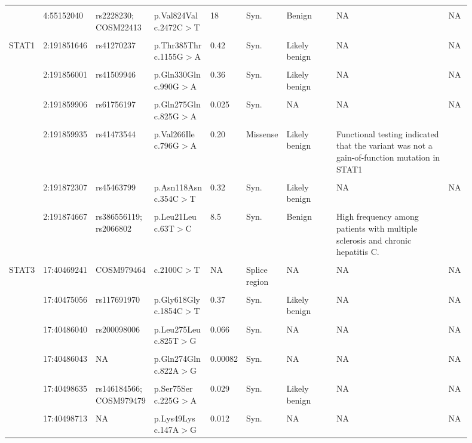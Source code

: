 \begin{landscape}
\begin{longtable}{p{0.07\linewidth}|p{0.09\linewidth}p{0.11\linewidth}p{0.1\linewidth}p{0.05\linewidth}p{0.065\linewidth}p{0.11\linewidth}p{0.25\linewidth}p{0.05\linewidth}}
		\\
		\\
		& 4:55152040 & rs2228230; COSM22413 & p.Val824Val c.2472C$>$T & 18 & Syn. & Benign & NA & NA
		\\
		\\
		\hline
		STAT1 & 2:191851646 & rs41270237 & p.Thr385Thr c.1155G$>$A & 0.42 & Syn. & Likely benign & NA & NA
		\\
		\\
		& 2:191856001 & rs41509946 & p.Gln330Gln c.990G$>$A & 0.36 & Syn. & Likely benign & NA & NA
		\\
		\\
		& 2:191859906 & rs61756197 & p.Gln275Gln c.825G$>$A & 0.025 & Syn. & NA & NA & NA
		\\
		\\
		& 2:191859935 & rs41473544 & p.Val266Ile c.796G$>$A & 0.20 & Missense & Likely benign & Functional testing indicated that the variant was not a gain-of-function mutation in STAT1 & \cite{Depner2016}
		\\
		\\
		& 2:191872307 & rs45463799 & p.Asn118Asn c.354C$>$T & 0.32 & Syn. & Likely benign & NA & NA
		\\
		\\
		& 2:191874667 & rs386556119; rs2066802 & p.Leu21Leu c.63T$>$C & 8.5 & Syn. & Benign & High frequency among patients with multiple sclerosis and chronic hepatitis C. & \cite{Fortunato2008}
		\\
		\\
		\hline
		STAT3 & 17:40469241 & COSM979464 & c.2100C$>$T & NA & Splice region & NA & NA & NA
		\\
		\\
		& 17:40475056 & rs117691970 & p.Gly618Gly c.1854C$>$T & 0.37 & Syn. & Likely benign & NA & NA
		\\
		\\
		& 17:40486040 & rs200098006 & p.Leu275Leu c.825T$>$G & 0.066 & Syn. & NA & NA & NA
		\\
		\\
		& 17:40486043 & NA & p.Gln274Gln c.822A$>$G & 0.00082 & Syn. & NA & NA & NA
		\\
		\\
		& 17:40498635 & rs146184566; COSM979479 & p.Ser75Ser c.225G$>$A & 0.029 & Syn. & Likely benign & NA & NA
		\\
		\\
		& 17:40498713 & NA & p.Lys49Lys c.147A$>$G & 0.012 & Syn. & NA & NA & NA
		\\

\end{longtable}
\end{landscape}
